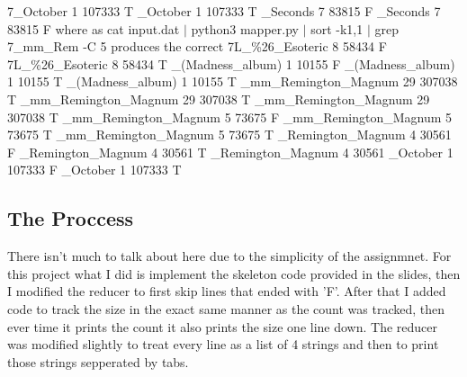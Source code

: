 \documentclass{article}
\begin{document}
7\_October	1	107333	T
\_October	1	107333	T
\_Seconds	7	83815	F
\_Seconds	7	83815	F
\newline
\newline
where as cat input.dat $|$ python3 mapper.py $|$ sort -k1,1 $|$ grep 7\_mm\_Rem -C 5 produces the correct
\newline
\newline
7L\_\%26\_Esoteric	8	58434	F
\newline
7L\_\%26\_Esoteric	8	58434	T
\_(Madness\_album)	1	10155	F
\_(Madness\_album)	1	10155	T
\_(Madness\_album)	1	10155	T
\_mm\_Remington\_Magnum	29	307038	T
\_mm\_Remington\_Magnum	29	307038	T
\_mm\_Remington\_Magnum	29	307038	T
\_mm\_Remington\_Magnum	5	73675	F
\_mm\_Remington\_Magnum	5	73675	T
\_mm\_Remington\_Magnum	5	73675	T
\newline
7mm\_Remington\_Magnum	4	30561	F
\newline
7mm\_Remington\_Magnum	4	30561	T
\newline
7mm\_Remington\_Magnum	4	30561	
\_October	1	107333	F
\_October	1	107333	T

\subsection{The Proccess}
There isn't much to talk about here due to the simplicity of the assignmnet. For this project what I did is implement the skeleton code provided in the slides, then I modified the reducer to first skip lines that ended with 'F'. After that I added code to track the size in the exact same manner as the count was tracked, then ever time it prints the count it also prints the size one line down. The reducer was modified slightly to treat every line as a list of 4 strings and then to print those strings sepperated by tabs.
\end{document}
